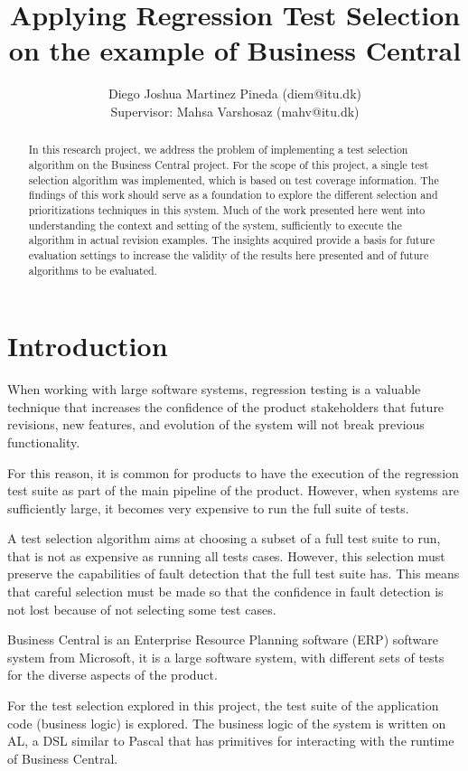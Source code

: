 \documentclass{article}
\title{Applying Regression Test Selection on the example of Business Central}
\author{Diego Joshua Martinez Pineda (diem@itu.dk)\\Supervisor: Mahsa Varshosaz (mahv@itu.dk)}
\begin{document}
\maketitle

\begin{abstract}
In this research project, we address the problem of implementing a test selection algorithm on the Business Central project. For the scope of this project, a single test selection algorithm was implemented, which is based on test coverage information. The findings of this work should serve as a foundation to explore the different selection and prioritizations techniques in this system. Much of the work presented here went into understanding the context and setting of the system, sufficiently to execute the algorithm in actual revision examples. The insights acquired provide a basis for future evaluation settings to increase the validity of the results here presented and of future algorithms to be evaluated.
\end{abstract}

\section{Introduction}\label{section:overview}
   When working with large software systems, regression testing is a valuable technique that increases the confidence of the product stakeholders that future revisions, new features, and evolution of the system will not break previous functionality.

   For this reason, it is common for products to have the execution of the regression test suite as part of the main pipeline of the product. However, when systems are sufficiently large, it becomes very expensive to run the full suite of tests.

   A test selection algorithm aims at choosing a subset of a full test suite to run, that is not as expensive as running all tests cases. However, this selection must preserve the capabilities of fault detection that the full test suite has. This means that careful selection must be made so that the confidence in fault detection is not lost because of not selecting some test cases.

   Business Central is an Enterprise Resource Planning software (ERP) software system from Microsoft, it is a large software system, with different sets of tests for the diverse aspects of the product.

   For the test selection explored in this project, the test suite of the application code (business logic) is explored. The business logic of the system is written on AL, a DSL similar to Pascal that has primitives for interacting with the runtime of Business Central.
\end{document}
